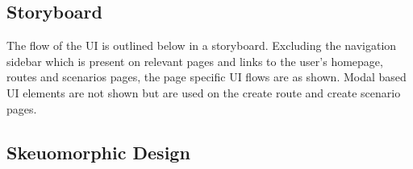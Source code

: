 \subsection{Storyboard}

The flow of the UI is outlined below in a storyboard. Excluding the navigation sidebar which is present on relevant pages and links to the user's homepage, routes and scenarios pages, the page specific UI flows are as shown. Modal based UI elements are not shown but are used on the create route and create scenario pages.


\subsection{Skeuomorphic Design}